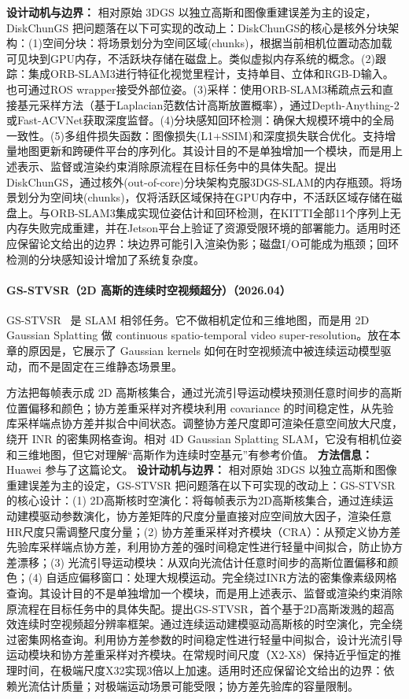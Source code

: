 \textbf{设计动机与边界：} 相对原始 3DGS 以独立高斯和图像重建误差为主的设定，DiskChunGS 把问题落在以下可实现的改动上：DiskChunGS的核心是核外分块架构：(1)空间分块：将场景划分为空间区域(chunks)，根据当前相机位置动态加载可见块到GPU内存，不活跃块存储在磁盘上。类似虚拟内存系统的概念。(2)跟踪：集成ORB-SLAM3进行特征化视觉里程计，支持单目、立体和RGB-D输入。也可通过ROS wrapper接受外部位姿。(3)采样：使用ORB-SLAM3稀疏点云和直接基元采样方法（基于Laplacian范数估计高斯放置概率），通过Depth-Anything-2或Fast-ACVNet获取深度监督。(4)分块感知回环检测：确保大规模环境中的全局一致性。(5)多组件损失函数：图像损失(L1+SSIM)和深度损失联合优化。支持增量地图更新和跨硬件平台的序列化。其设计目的不是单独增加一个模块，而是用上述表示、监督或渲染约束消除原流程在目标任务中的具体失配。提出DiskChunGS，通过核外(out-of-core)分块架构克服3DGS-SLAM的内存瓶颈。将场景划分为空间块(chunks)，仅将活跃区域保持在GPU内存中，不活跃区域存储在磁盘上。与ORB-SLAM3集成实现位姿估计和回环检测，在KITTI全部11个序列上无内存失败完成重建，并在Jetson平台上验证了资源受限环境的部署能力。适用时还应保留论文给出的边界：块边界可能引入渲染伪影；磁盘I/O可能成为瓶颈；回环检测的分块感知设计增加了系统复杂度。
\paragraph{GS-STVSR（2D 高斯的连续时空视频超分）（2026.04）}
GS-STVSR~\cite{2604_18047} 是 SLAM 相邻任务。它不做相机定位和三维地图，而是用 2D Gaussian Splatting 做 continuous spatio-temporal video super-resolution。放在本章的原因是，它展示了 Gaussian kernels 如何在时空视频流中被连续运动模型驱动，而不是固定在三维静态场景里。

方法把每帧表示成 2D 高斯核集合，通过光流引导运动模块预测任意时间步的高斯位置偏移和颜色；协方差重采样对齐模块利用 covariance 的时间稳定性，从先验库采样端点协方差并拟合中间状态。调整协方差尺度即可渲染任意空间放大尺度，绕开 INR 的密集网格查询。相对 4D Gaussian Splatting SLAM，它没有相机位姿和三维地图，但它对理解“高斯作为连续时空基元”有参考价值。
\textbf{方法信息：} Huawei 参与了这篇论文。
\textbf{设计动机与边界：} 相对原始 3DGS 以独立高斯和图像重建误差为主的设定，GS-STVSR 把问题落在以下可实现的改动上：GS-STVSR的核心设计：(1) 2D高斯核时空演化：将每帧表示为2D高斯核集合，通过连续运动建模驱动参数演化，协方差矩阵的尺度分量直接对应空间放大因子，渲染任意HR尺度只需调整尺度分量；(2) 协方差重采样对齐模块（CRA）：从预定义协方差先验库采样端点协方差，利用协方差的强时间稳定性进行轻量中间拟合，防止协方差漂移；(3) 光流引导运动模块：从双向光流估计任意时间步的高斯位置偏移和颜色；(4) 自适应偏移窗口：处理大规模运动。完全绕过INR方法的密集像素级网格查询。其设计目的不是单独增加一个模块，而是用上述表示、监督或渲染约束消除原流程在目标任务中的具体失配。提出GS-STVSR，首个基于2D高斯泼溅的超高效连续时空视频超分辨率框架。通过连续运动建模驱动高斯核的时空演化，完全绕过密集网格查询。利用协方差参数的时间稳定性进行轻量中间拟合，设计光流引导运动模块和协方差重采样对齐模块。在常规时间尺度（X2-X8）保持近乎恒定的推理时间，在极端尺度X32实现3倍以上加速。适用时还应保留论文给出的边界：依赖光流估计质量；对极端运动场景可能受限；协方差先验库的容量限制。
